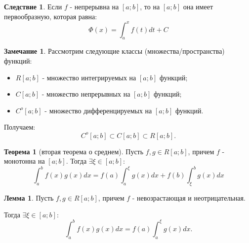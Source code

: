 \documentclass{report}
\theoremstyle{definition}
\newtheorem*{effect}{Следствие}
\newtheorem*{remark}{Замечание}
\newtheorem{lemma}{Лемма}[section]
\newtheorem{theorem}{Теорема}[section]
\begin{document}
\begin{effect}
  Если $f$ - непрерывна на $[a;b]$, то на $[a;b]$ она имеет первообразную, которая равна:
  \begin{equation*}
    \Phi (x) = \int_{a}^{x}f(t)dt + C
  \end{equation*}
\end{effect}

\begin{remark}
  Рассмотрим следующие классы (множества/пространства) функций:
  \begin{itemize}
    \item $R[a;b]$ - множество интегрируемых на $[a;b]$ функций;
    \item $C[a;b]$ - множество непрерывных на $[a;b]$ функций;
    \item $C^{o}[a;b]$ - множество дифференцируемых на $[a;b]$ функций.
  \end{itemize}
  Получаем:
  \begin{equation*}
    C^{o}[a;b]\subset C[a;b] \subset R[a;b].
  \end{equation*}
\end{remark}

\begin{theorem}[вторая теорема о среднем]
  Пусть $f,g\in R[a;b]$, причем $f$ - монотонна на $[a;b]$. Тогда $\exists \xi \in [a;b]:$
  \begin{equation*}
    \int_{a}^{b}f(x)g(x)dx = f(a)\int_{a}^{\xi}g(x)dx + f(b)\int_{\xi}^{b}g(x)dx
  \end{equation*}
\end{theorem}

\begin{lemma}
  Пусть $f,g\in R[a;b]$, причем $f$ - невозрастающая и неотрицательная.

  Тогда $\exists \xi \in [a;b]:$
  \begin{equation*}
    \int_{a}^{b}f(x)g(x)dx = f(a)\int_{a}^{\xi}g(x)dx.
  \end{equation*}
\end{lemma}
\end{document}
